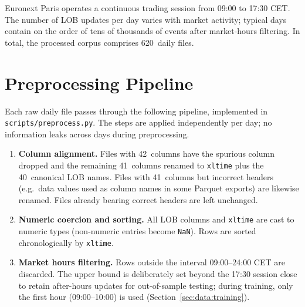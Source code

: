 \documentclass[11pt]{report}
\begin{document}
Euronext Paris operates a continuous trading session from 09:00 to 17:30 CET. The number of LOB updates per day varies with market activity; typical days contain on the order of tens of thousands of events after market-hours filtering. In total, the processed corpus comprises 620~daily files.

\section{Preprocessing Pipeline}\label{sec:data:preprocessing}

Each raw daily file passes through the following pipeline, implemented in \texttt{scripts/preprocess.py}.
The steps are applied independently per day; no information leaks across days during preprocessing.

\begin{enumerate}
\item \textbf{Column alignment.} Files with 42~columns have the spurious column dropped and the remaining 41~columns renamed to \texttt{xltime} plus the 40~canonical LOB names. Files with 41~columns but incorrect headers (e.g.\ data values used as column names in some Parquet exports) are likewise renamed. Files already bearing correct headers are left unchanged.

\item \textbf{Numeric coercion and sorting.} All LOB columns and \texttt{xltime} are cast to numeric types (non-numeric entries become \texttt{NaN}). Rows are sorted chronologically by \texttt{xltime}.

\item \textbf{Market hours filtering.} Rows outside the interval 09:00--24:00 CET are discarded. The upper bound is deliberately set beyond the 17:30 session close to retain after-hours updates for out-of-sample testing; during training, only the first hour (09:00--10:00) is used (Section~\ref{sec:data:training}).


\end{enumerate}
\end{document}
